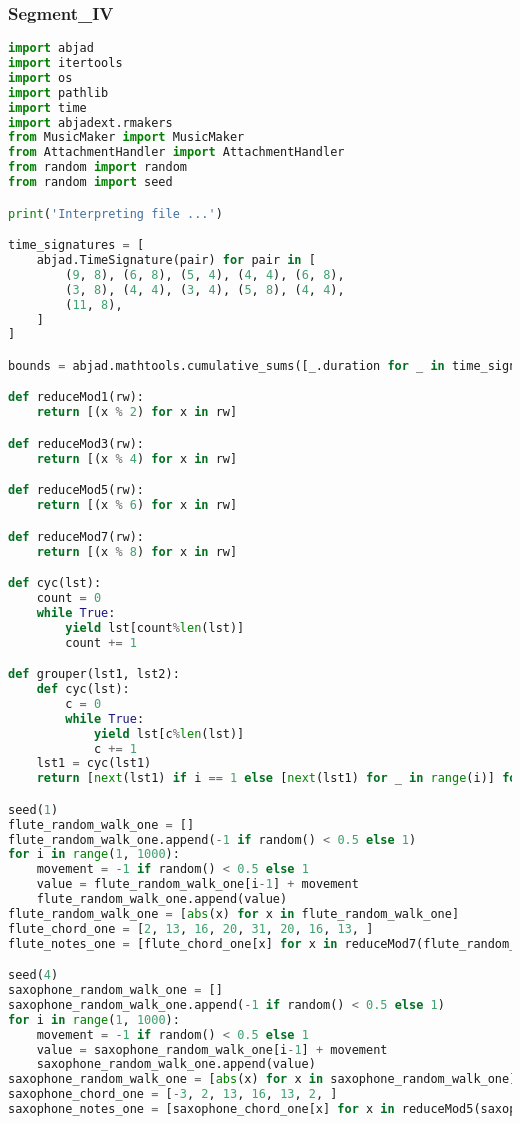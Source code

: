 \subsubsection{Segment\_IV}
\singlespace
\begin{lstlisting}[language=Python, caption=Four Ages of Sand Segment\_IV]
import abjad
import itertools
import os
import pathlib
import time
import abjadext.rmakers
from MusicMaker import MusicMaker
from AttachmentHandler import AttachmentHandler
from random import random
from random import seed

print('Interpreting file ...')

time_signatures = [
    abjad.TimeSignature(pair) for pair in [
        (9, 8), (6, 8), (5, 4), (4, 4), (6, 8),
        (3, 8), (4, 4), (3, 4), (5, 8), (4, 4),
        (11, 8),
    ]
]

bounds = abjad.mathtools.cumulative_sums([_.duration for _ in time_signatures])

def reduceMod1(rw):
    return [(x % 2) for x in rw]

def reduceMod3(rw):
    return [(x % 4) for x in rw]

def reduceMod5(rw):
    return [(x % 6) for x in rw]

def reduceMod7(rw):
    return [(x % 8) for x in rw]

def cyc(lst):
    count = 0
    while True:
        yield lst[count%len(lst)]
        count += 1

def grouper(lst1, lst2):
    def cyc(lst):
        c = 0
        while True:
            yield lst[c%len(lst)]
            c += 1
    lst1 = cyc(lst1)
    return [next(lst1) if i == 1 else [next(lst1) for _ in range(i)] for i in lst2]

seed(1)
flute_random_walk_one = []
flute_random_walk_one.append(-1 if random() < 0.5 else 1)
for i in range(1, 1000):
    movement = -1 if random() < 0.5 else 1
    value = flute_random_walk_one[i-1] + movement
    flute_random_walk_one.append(value)
flute_random_walk_one = [abs(x) for x in flute_random_walk_one]
flute_chord_one = [2, 13, 16, 20, 31, 20, 16, 13, ]
flute_notes_one = [flute_chord_one[x] for x in reduceMod7(flute_random_walk_one)]

seed(4)
saxophone_random_walk_one = []
saxophone_random_walk_one.append(-1 if random() < 0.5 else 1)
for i in range(1, 1000):
    movement = -1 if random() < 0.5 else 1
    value = saxophone_random_walk_one[i-1] + movement
    saxophone_random_walk_one.append(value)
saxophone_random_walk_one = [abs(x) for x in saxophone_random_walk_one]
saxophone_chord_one = [-3, 2, 13, 16, 13, 2, ]
saxophone_notes_one = [saxophone_chord_one[x] for x in reduceMod5(saxophone_random_walk_one)]


\end{lstlisting}
